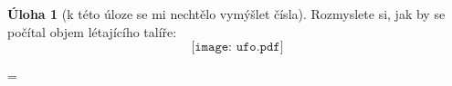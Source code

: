 \documentclass[10pt,a5paper]{article}
\theoremstyle{definition}
\newtheorem{uloha}{Úloha}
\def\vysld{}
\let\printvysl\relax
\begin{document}
\begin{uloha}[k této úloze se mi nechtělo vymýšlet čísla]
Rozmyslete si, jak by se počítal objem létajícího talíře:
\[ \texttt{[image: ufo.pdf]} \]
\end{uloha}


\newpage
\parindent=0pt
\parskip=\smallskipamount
\def\printvysl#1#2{\textbf{#1.}\ #2\par}
\vysld
\end{document}
